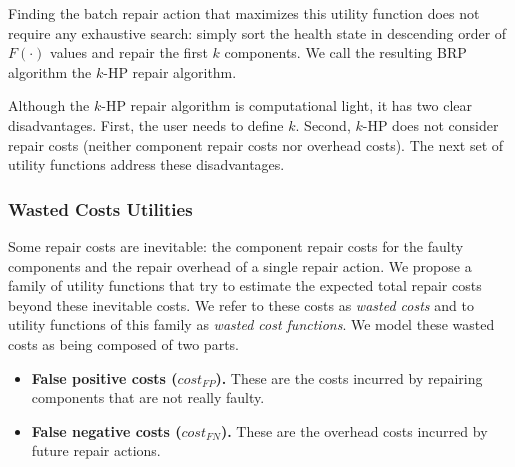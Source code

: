 \documentclass[review]{elsarticle}
\newcommand\meir[1]{\textcolor{red}{meir: #1}}
\begin{document}
Finding the batch repair action that maximizes this utility function does not require any exhaustive search: simply sort the health state in descending order of $F(\cdot)$ values and repair the first $k$ components. We call the resulting BRP algorithm the $k$-HP repair algorithm. 


Although the $k$-HP repair algorithm is computational light, it has two clear disadvantages. First, the user needs to define $k$. Second, $k$-HP does not consider repair costs (neither component repair costs nor overhead costs).
The next set of utility functions address these disadvantages.

\subsubsection{Wasted Costs Utilities}

Some repair costs are inevitable: the component repair costs for the faulty components
and the repair overhead of a single repair action. We propose a family of utility functions that try to estimate the expected total repair costs beyond these inevitable costs. We refer to these costs as {\em wasted costs} and to utility functions of this family as {\em wasted cost functions}. We model these wasted costs as being composed of two parts.
\begin{itemize}
\item {\bf False positive costs ($cost_{FP}$).} These are the costs incurred by repairing components that are not really faulty.
\item {\bf False negative costs ($cost_{FN}$).} These are the overhead costs incurred by future repair actions.
\end{itemize}




\end{document}
